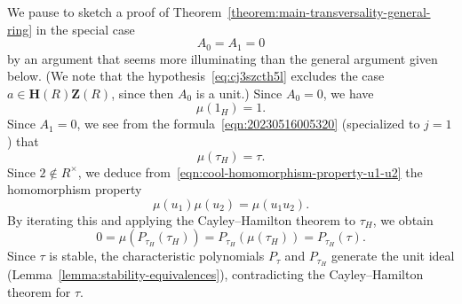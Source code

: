 \documentclass[reqno]{amsart}
\theoremstyle{plain} \newtheorem{theorem} {Theorem} \newtheorem{conjecture} {Conjecture} \newtheorem{corollary} [theorem] {Corollary} \newtheorem{proposition} [theorem] {Proposition} \newtheorem{fact} [theorem] {Fact}
\theoremstyle{definition} \newtheorem{definition} [theorem] {Definition}
\theoremstyle{itplain} %
\begin{document}
\begin{remark}\label{remark:sketch-proof-when-A0-A1-vanish}
  We pause to sketch a proof of Theorem~\ref{theorem:main-transversality-general-ring} in the special case
  \begin{equation}\label{eq:cj3szcth5l}
    A_0 = A_1 = 0
  \end{equation}
  by an argument that seems more illuminating than the general argument given below.  (We note that the hypothesis~\eqref{eq:cj3szcth5l} excludes the case $a \in \mathbf{H}(R) \mathbf{Z}(R)$, since then $A_0$ is a unit.)  Since $A_0 = 0$, we have
  \begin{equation*}
    \mu(1_H) = 1.
  \end{equation*}
  Since $A_1 = 0$, we see from the formula~\eqref{eqn:20230516005320} (specialized to $j=1$) that
  \begin{equation*}
    \mu(\tau_H) = \tau.
  \end{equation*}
  Since $2 \notin R^\times$, we deduce from~\eqref{eqn:cool-homomorphism-property-u1-u2} the homomorphism property
  \begin{equation*}
    \mu(u_1) \mu(u_2) = \mu(u_1 u_2).
  \end{equation*}
  By iterating this and applying the Cayley--Hamilton theorem to $\tau_H$, we obtain
  \begin{equation*}
    0 = \mu(P_{\tau_H}(\tau_H)) = P_{\tau_H}(\mu(\tau_H)) = P_{\tau_H}(\tau).
  \end{equation*}
  Since $\tau$ is stable, the characteristic polynomials $P_\tau$ and $P_{\tau_H}$ generate the unit ideal (Lemma~\ref{lemma:stability-equivalences}), contradicting the Cayley--Hamilton theorem for $\tau$.
\end{remark}
\end{document}
